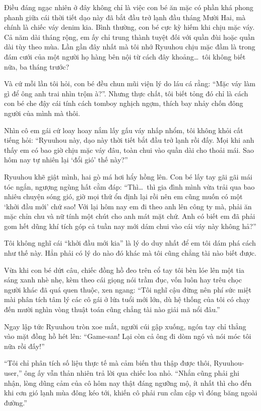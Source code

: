 \documentclass[../main.tex]{subfiles}
\begin{document}

Điều đáng ngạc nhiên ở đây không chỉ là việc con bé ăn mặc có phần khá phong phanh giữa cái thời tiết dạo này đã bắt đầu trở lạnh đầu tháng Mười Hai, mà chính là chiếc váy denim kia. Bình thường, con bé cực kỳ hiếm khi chịu mặc váy. Cả năm dài tháng rộng, em ấy chỉ trung thành tuyệt đối với quần đùi hoặc quần dài tùy theo mùa. Lần gần đây nhất mà tôi nhớ Ryuuhou chịu mặc đầm là trong đám cưới của một người họ hàng bên nội từ cách đây khoảng\dots\ tôi không biết nữa, ba tháng trước?

Và cứ mỗi lần tôi hỏi, con bé đều chun mũi viện lý do láu cá rằng: ``Mặc váy làm gì để ông anh trai nhìn trộm à?''. Nhưng thực chất, tôi biết tỏng đó chỉ là cách con bé che đậy cái tính cách tomboy nghịch ngợm, thích bay nhảy chốn đông người của mình mà thôi.

Nhìn cô em gái cứ loay hoay nắm lấy gấu váy nhấp nhổm, tôi không khỏi cất tiếng hỏi: ``Ryuuhou này, dạo này thời tiết bắt đầu trở lạnh rồi đấy. Mọi khi anh thấy em có bao giờ chịu mặc váy đâu, toàn chui vào quần dài cho thoải mái. Sao hôm nay tự nhiên lại `đổi gió' thế này?''

Ryuuhou khẽ giật mình, hai gò má hơi hẩy hồng lên. Con bé lấy tay gãi gãi mái tóc ngắn, ngượng ngùng hất cằm đáp: ``Thì\dots\ thì gia đình mình vừa trải qua bao nhiêu chuyện sóng gió, giờ mọi thứ ổn định lại rồi nên em cũng muốn có một `khởi đầu mới' chứ sao! Với lại hôm nay em đi theo anh lên công ty mà, phải ăn mặc chỉn chu và nữ tính một chút cho anh mát mặt chứ. Anh có biết em đã phải gom hết dũng khí tích góp cả tuần nay mới dám chui vào cái váy này không hả?''

Tôi không nghĩ cái ``khởi đầu mới kia'' là lý do duy nhất để em tôi dám phá cách như thế này. Hẳn phải có lý do nào đó khác mà tôi cũng chẳng tài nào biết được.

Vừa khi con bé dứt câu, chiếc đồng hồ đeo trên cổ tay tôi bèn lóe lên một tia sáng xanh nhè nhẹ, kèm theo cái giọng nói trầm đục, vốn luôn hay trêu chọc người khác đã quá quen thuộc, xen ngang: ``Tôi nghĩ cậu đừng nên phí sức miệt mài phân tích tâm lý các cô gái ở lứa tuổi mới lớn, dù hệ thống của tôi có chạy đến mười nghìn vòng thuật toán cũng chẳng tài nào giải mã nổi đâu.''

Ngay lập tức Ryuuhou tròn xoe mắt, người cúi gập xuống, ngón tay chỉ thẳng vào mặt đồng hồ hét lên: ``Game-san! Lại còn cả ông đi dòm ngó và nói móc tôi nữa rồi đấy!''

``Tôi chỉ phân tích số liệu thực tế mà cảm biến thu thập được thôi, Ryuuhou-user,'' ông ấy vẫn thản nhiên trả lời qua chiếc loa nhỏ. ``Nhắn cũng phải ghi nhận, lòng dũng cảm của cô hôm nay thật đáng ngưỡng mộ, ít nhất thì cho đến khi cơn gió lạnh mùa đông kéo tới, khiến cô phải run cầm cập vì đóng băng ngoài đường.''
\end{document}

